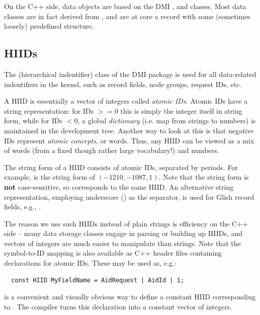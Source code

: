 \documentclass[10pt,twoside]{book}
\begin{document}
  On the C++ side, data objects are based on the DMI ,
   and  classes. Most data classes are in fact
  derived from , and are at core a record with some (sometimes
  loosely) predefined structure.

\subsection{HIIDs}

  The  (hierarchical indentifier) class of the DMI package is used for
  all data-related indentifiers in the kernel, such as record fields, node
  groups, request IDs, etc.
  
  A HIID is essentially a vector of integers called {\em atomic IDs}. Atomic
  IDs have a string representation: for IDs $>=$0 this is simply the integer
  itself in string form, while for IDs $<$0, a global {\em dictionary} (i.e.
  map from strings to numbers) is maintained in the development tree. Another
  way to look at this is that negative IDs represent {\em atomic concepts}, or
  words. Thus, any HIID can be viewed as a mix of words (from a fixed though
  rather large vocabulary!) and numbers.

  The string form of a HIID consists of atomic IDs, separated by periods. For
  example,  is the string form of $(-1210,-1087,1)$. Note
  that the string form is {\bf not} case-sensitive, so 
  corresponds to the same HIID. An alternative string representation, employing
  underscore () as the separator, is used for Glish record fields,
  e.g., . 

  The reason we use such HIIDs instead of plain strings is efficiency on the
  C++ side -- many data storage classes engage in parsing or building up HIIDs,
  and vectors of integers are much easier to manipulate than strings. Note that
  the symbol-to-ID mapping is also available as C++ header files containing
   declarations for atomic IDs. These may be used as, e.g.:

  \begin{verbatim}
  const HIID MyFieldName = AidRequest | AidId | 1;
  \end{verbatim}
  
  is a convenient and visually obvious way to define a constant HIID
  corresponding to . The compiler turns this declaration
  into a constant vector of integers.
\end{document}
